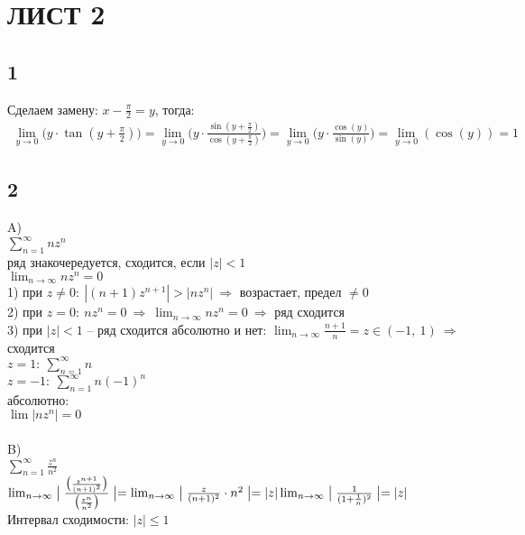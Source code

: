 \newpage
	\section{ЛИСТ 2}
		\subsection{1}
		Сделаем замену:
		$x - \frac{\pi}{2} = y$, тогда:
		\begin{gather*}
			\lim_{y \to 0} \biggl( y \cdot \tan (y + \frac{\pi}{2}) \biggl) = 
			\lim_{y \to 0} \biggl( y \cdot \frac{\sin(y + \frac{\pi}{2})}{\cos(y + \frac{\pi}{2})} \biggl) = 
			\lim_{y \to 0} \biggl( y \cdot \frac{\cos(y)}{ \sin(y)} \biggl) = \lim_{y \to 0} (\cos(y) ) = 
			1
		\end{gather*}
	
		\subsection{2}
		A)\\
		$\sum^{\infty}_{n = 1} n z^n$\\
		ряд знакочередуется, сходится, если $|z| < 1$\\
		$\lim_{n \to \infty} n z^n = 0$\\
		1) при $z \ne 0:\ |(n + 1)z^{n + 1}| > |n z^n| \ \Rightarrow$ возрастает, предел $\ne 0$\\
		2) при $z = 0:\ n z^n = 0 \ \Rightarrow \ \lim_{n \to \infty} nz^n = 0 \ \Rightarrow$ ряд сходится\\
		3) при $|z| < 1$ -- ряд сходится абсолютно и нет: $\lim_{n \to \infty} \frac{n+1}{n} = z \in (-1,\ 1) \ \Rightarrow$ сходится\\
		$z = 1:\ \sum^{\infty}_{n = 1} n$\\
		$z = -1: \ \sum^{\infty}_{n = 1} n(-1)^n$\\
		абсолютно:\\
		$\lim |n z^n| = 0$ 
		\\ \\
		B)\\
		$\sum^{\infty}_{n = 1} \frac{z^n}{n^2}$\\ 
		$\lim _ { n \rightarrow \infty } \bigm| \frac { \bigm( \frac { z^{n + 1} } { ( n + 1 ) ^ { 2 } } \bigm) } { \bigm( \frac { z ^ { n } } { n ^ { 2 } } \bigm) } \bigm| =
		\lim_{n \to \infty} \bigm| \frac{z}{(n + 1)^2} \cdot n^2 \bigm| = |z| \lim_{n \to \infty} \bigm| \frac{1}{(1 + \frac{1}{n})^2} \bigm| = |z|$\\
		Интервал сходимости: $|z| \leq 1$\\
